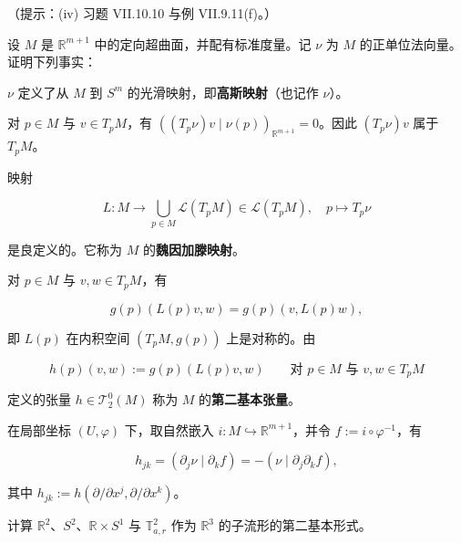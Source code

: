 \begin{exercises}
（提示：(iv) 习题 VII.10.10 与例 VII.9.11(f)。）

\item

设 $ M $ 是 $ \mathbb{R}^{m+1} $ 中的定向超曲面，并配有标准度量。记 $ \nu $ 为 $ M $ 的正单位法向量。证明下列事实：

\begin{subitems}
\item

$ \nu $ 定义了从 $ M $ 到 $ S^{m} $ 的光滑映射，即\textbf{高斯映射}（也记作 $ \nu $）。

\item

对 $ p \in M $ 与 $ v \in T_{p}M $，有 $ ((T_{p}\nu)v \mid \nu(p))_{\mathbb{R}^{m+1}} = 0 $。因此 $ (T_{p}\nu)v $ 属于 $ T_{p}M $。

\item

映射

\[
L : M \to \bigcup_{p\in M} \mathcal{L}(T_{p}M) \in \mathcal{L}(T_{p}M) , \quad p \mapsto T_{p}\nu
\]

是良定义的。它称为 $ M $ 的\textbf{魏因加滕映射}。

\item

对 $ p \in M $ 与 $ v, w \in T_{p}M $，有

\[
g(p)(L(p)v, w) = g(p)(v, L(p)w) ,
\]

即 $ L(p) $ 在内积空间 $ (T_{p}M, g(p)) $ 上是对称的。由

\[
h(p)(v, w) := g(p)(L(p)v, w) \qquad \text{对 } p \in M \text{ 与 } v, w \in T_{p}M
\]

定义的张量 $ h \in \mathcal{T}_{2}^{0}(M) $ 称为 $ M $ 的\textbf{第二基本张量}。

\item

在局部坐标 $ (U, \varphi) $ 下，取自然嵌入 $ i : M \hookrightarrow \mathbb{R}^{m+1} $，并令 $ f := i \circ \varphi^{-1} $，有

\[
h_{jk} = (\partial_{j}\nu \mid \partial_{k}f) = -(\nu \mid \partial_{j}\partial_{k}f) ,
\]

其中 $ h_{jk} := h(\partial/\partial x^{j}, \partial/\partial x^{k}) $。

\end{subitems}

\item

计算 $ \mathbb{R}^{2} $、$ S^{2} $、$ \mathbb{R} \times S^{1} $ 与 $ \mathbb{T}^{2}_{a,r} $ 作为 $ \mathbb{R}^{3} $ 的子流形的第二基本形式。


\end{exercises}
